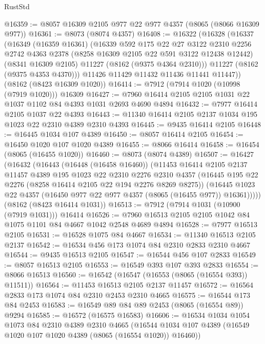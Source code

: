 \begin{lexlean}{RustStd}
\begin{coremodule}
@16359 := @8057 @16309 @2105 @977 @22 @977 @4357 (@8065 (@8066 @16309 @977))
@16361 := @8073 (@8074 @4357)
@16408 := @16322
    (@16328
      (@16337
        (@16349
          (@16359 @16361)
          (@16339
            @592
            @175
            @22
            @27
            @3122
            @2310
            @2256
            @2742
            @4363
            @2378
            (@8258 @16309 @2105 @22 @591 @3122 @12438 @12442)
            (@8341 @16309 @2105)
            @11227
            (@8162 (@9375 @4364 @2310)))
          @11227
          (@8162 (@9375 @4353 @4370)))
        @11426
        @11429
        @11432
        @11436
        @11441
        @11447))
    (@8162 (@8423 @16309 @1020))
@16414 := @7912 (@7914 @1020 (@10998 (@7919 @1020))) @16309
@16427 := @7960 @16414 @2105 @2105 @1031 @22 @1037 @1102 @84 @4393 @1031 @2693 @4690 @4894
@16432 := @7977 @16414 @2105 @1037 @22 @4393
@16443 := @11340 @16414 @2105 @2137 @1034 @195 @1023 @22 @2310 @4389 @2310 @4393
@16445 := @9435 @16414 @2105
@16448 := @16445 @1034 @107 @4389
@16450 := @8057 @16414 @2105
@16454 := @16450 @1020 @107 @1020 @4389
@16455 := @8066 @16414
@16458 := @16454 (@8065 (@16455 @1020))
@16460 := @8073 (@8074 @4389)
@16507 := @16427
    (@16432
      (@16443
        (@16448 (@16458 @16460))
        (@11453
          @16414
          @2105
          @2137
          @11457
          @4389
          @195
          @1023
          @22
          @2310
          @2276
          @2310
          @4357
          (@16445 @195 @22 @2276 (@8258 @16414 @2105 @22 @194 @2276 @8269 @8275))
          (@16445 @1023 @22 @4357 (@16450 @977 @22 @977 @4357 (@8065 (@16455 @977)) @16361)))))
    (@8162 (@8423 @16414 @1031))
@16513 := @7912 (@7914 @1031 (@10900 (@7919 @1031))) @16414
@16526 := @7960 @16513 @2105 @2105 @1042 @84 @1075 @1101 @84 @4667 @1042 @2548 @4689 @4894
@16528 := @7977 @16513 @2105
@16531 := @16528 @1075 @84 @4667
@16534 := @11340 @16513 @2105 @2137
@16542 := @16534 @456 @173 @1074 @84 @2310 @2833 @2310 @4667
@16544 := @9435 @16513 @2105
@16547 := @16544 @456 @107 @2833
@16549 := @8057 @16513 @2105
@16553 := @16549 @393 @107 @393 @2833
@16554 := @8066 @16513
@16560 := @16542 (@16547 (@16553 (@8065 (@16554 @393)) @11511))
@16564 := @11453 @16513 @2105 @2137 @11457
@16572 := @16564 @2833 @173 @1074 @84 @2310 @2453 @2310 @4665
@16575 := @16544 @173 @84 @2453
@16583 := @16549 @89 @84 @89 @2453 (@8065 (@16554 @89)) @9294
@16585 := @16572 (@16575 @16583)
@16606 := @16534
    @1034
    @1054
    @1073
    @84
    @2310
    @4389
    @2310
    @4665
    (@16544 @1034 @107 @4389 (@16549 @1020 @107 @1020 @4389 (@8065 (@16554 @1020)) @16460))

\end{coremodule}
\end{lexlean}
